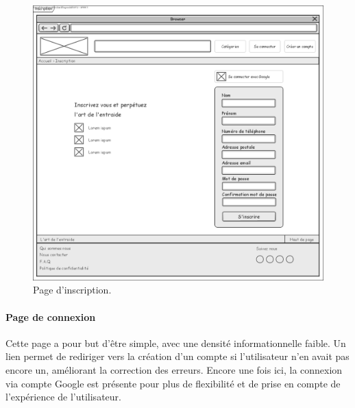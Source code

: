 \documentclass[a4paper,11pt]{article}
\begin{document}
\begin{figure}[H]
  \includegraphics[width=\linewidth]{../Conception/maquette/maquette-inscription.png}
  \caption{Page d'inscription.}
  \label{fig:maquette-inscription}
\end{figure}
\newpage

\paragraph{Page de connexion}

Cette page a pour but d'être simple, avec une densité informationnelle faible.
Un lien permet de rediriger vers la création d'un compte si l'utilisateur n'en
avait pas encore un, améliorant la correction des erreurs.
Encore une fois ici, la connexion via compte Google est présente pour plus de
flexibilité et de prise en compte de l'expérience de l'utilisateur.
\end{document}
